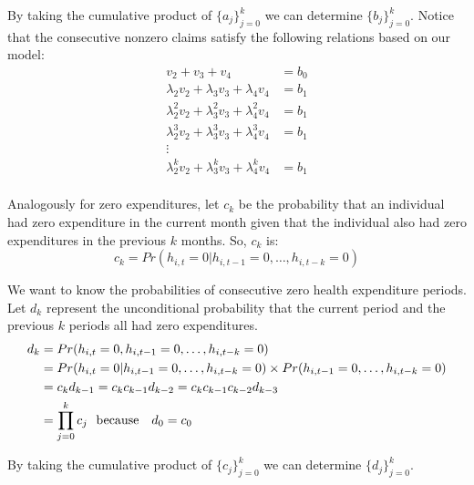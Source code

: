 \documentclass[letterpaper,12pt]{article}
\theoremstyle{definition}
\begin{document}
\begin{spacing}{1.5}{}
  By taking the cumulative product of $\{a_j\}_{j = 0}^{k}$ we can determine $\{b_j\}_{j = 0}^{k}$. Notice that the consecutive nonzero claims satisfy the following relations based on our model:
  \begin{equation}\label{eq:bk_cond}
  \begin{split}
    v_2 + v_3 + v_4 &= b_0 \\
    \lambda_2v_2 + \lambda_3v_3 + \lambda_4v_4 &= b_1\\
    \lambda_2^2v_2 + \lambda_3^2v_3 + \lambda_4^2v_4 &= b_1\\
    \lambda_2^3v_2 + \lambda_3^3v_3 + \lambda_4^3v_4 &= b_1\\
    \vdots \\
    \lambda_2^kv_2 + \lambda_3^kv_3 + \lambda_4^kv_4 &= b_1\\      
  \end{split}
  \end{equation}
  
  Analogously for zero expenditures, let $c_k$ be the probability that an individual had zero expenditure in the current month given that the individual also had zero expenditures in the previous $k$ months. So, $c_k$ is: 
  \begin{equation}\label{eq:ck}
    c_k = Pr(h_{i, t} = 0 | h_{i, t-1} = 0, \dots, h_{i, t-k} = 0)
  \end{equation}
  
  We want to know the probabilities of consecutive zero health expenditure periods. Let $d_k$ represent the unconditional probability that the current period and the previous $k$ periods all had zero expenditures.
  \begin{equation}\label{eq:dk}
  \begin{split}
    d_k &= Pr(h_{i, t} = 0, h_{i, t-1} = 0, \dots, h_{i, t-k} = 0) \\
        &= Pr(h_{i, t} = 0 | h_{i, t-1} = 0, \dots, h_{i, t-k} = 0) \times
        Pr(h_{i, t-1} = 0, \dots, h_{i, t-k} = 0) \\
        &= c_kd_{k-1} = c_kc_{k-1}d_{k-2} = c_kc_{k-1}c_{k-2}d_{k-3} \\
        &= \prod_{j = 0}^{k} c_j 
            \text{\space \space because \space \space} d_0 = c_0 \\
  \end{split}
  \end{equation}
  
  By taking the cumulative product of $\{c_j\}_{j = 0}^{k}$ we can determine $\{d_j\}_{j = 0}^{k}$.
  

\end{spacing}
\end{document}
